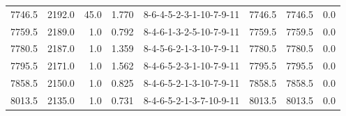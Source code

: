 \begin{tabular}{rrrrlrrr}
 7746.5 &  2192.0 &           45.0 &              1.770 &  8-6-4-5-2-3-1-10-7-9-11 &        7746.5 &          7746.5 &       0.0 \\
 7759.5 &  2189.0 &            1.0 &              0.792 &  8-4-6-1-3-2-5-10-7-9-11 &        7759.5 &          7759.5 &       0.0 \\
 7780.5 &  2187.0 &            1.0 &              1.359 &  8-4-5-6-2-1-3-10-7-9-11 &        7780.5 &          7780.5 &       0.0 \\
 7795.5 &  2171.0 &            1.0 &              1.562 &  8-4-6-5-2-3-1-10-7-9-11 &        7795.5 &          7795.5 &       0.0 \\
 7858.5 &  2150.0 &            1.0 &              0.825 &  8-4-6-5-2-1-3-10-7-9-11 &        7858.5 &          7858.5 &       0.0 \\
 8013.5 &  2135.0 &            1.0 &              0.731 &  8-4-6-5-2-1-3-7-10-9-11 &        8013.5 &          8013.5 &       0.0 \\
\bottomrule
\end{tabular}
